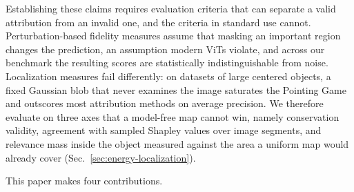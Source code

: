 \documentclass[lettersize,journal]{IEEEtran}
\theoremstyle{definition}
\theoremstyle{plain}
\begin{document}
Establishing these claims requires evaluation criteria that can separate a valid
attribution from an invalid one, and the criteria in standard use cannot.
Perturbation-based fidelity measures assume that masking an important region
changes the prediction, an assumption modern ViTs violate, and across our
benchmark the resulting scores are statistically indistinguishable from noise.
Localization measures fail differently: on datasets of large centered objects, a
fixed Gaussian blob that never examines the image saturates the Pointing Game
and outscores most attribution methods on average precision. We therefore
evaluate on three axes that a model-free map cannot win, namely conservation
validity, agreement with sampled Shapley values over image segments, and
relevance mass inside the object measured against the area a uniform map would
already cover (Sec.~\ref{sec:energy-localization}).

This paper makes four contributions.
\end{document}
